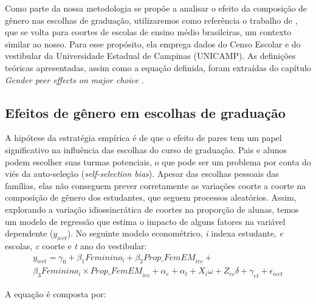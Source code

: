Como parte da nossa metodologia se propõe a analisar o efeito da composição de gênero nas escolhas de graduação, utilizaremos como referência o trabalho de \cite{Borges2021}, que se volta para coortes de escolas de ensino médio brasileiras, um contexto similar ao nosso. Para esse propósito, ela emprega dados do Censo Escolar e do vestibular da Universidade Estadual de Campinas (UNICAMP). As definições teóricas apresentadas, assim como a equação definida, foram extraídas do capítulo \textit{Gender peer effects on major choice} \autocite{Borges2021}. 

\subsection{Efeitos de gênero em escolhas de graduação}
A hipótese da estratégia empírica é de que o efeito de pares tem um papel significativo na influência das escolhas do curso de graduação. Pais e alunos podem escolher suas turmas potenciais, o que pode ser um problema por conta do viés da auto-seleção (\textit{self-selection bias}). Apesar das escolhas pessoais das famílias, elas não conseguem prever corretamente as variações coorte a coorte na composição de gênero dos estudantes, que seguem processos aleatórios. Assim, explorando a variação idiossincrática de coortes na proporção de alunas, temos um modelo de regressão que estima o impacto de alguns fatores na variável dependente ($y_{iect}$). No seguinte modelo econométrico, \textit{i} indexa estudante, \textit{e} escolas, \textit{c} coorte e \textit{t} ano do vestibular:
\begin{gather*}
y_{iect} = \gamma_0 + \beta_1 \textit{Feminino}_i + \beta_2 \textit{Prop\_FemEM}_{iec} + \\ \beta_3 \textit{Feminino}_i \times \textit{Prop\_FemEM}_{iec} + \alpha_e + \alpha_t + X_i \omega + Z_{ec} \delta + \gamma_{et} + \epsilon_{iect}
\end{gather*}

A equação é composta por:

